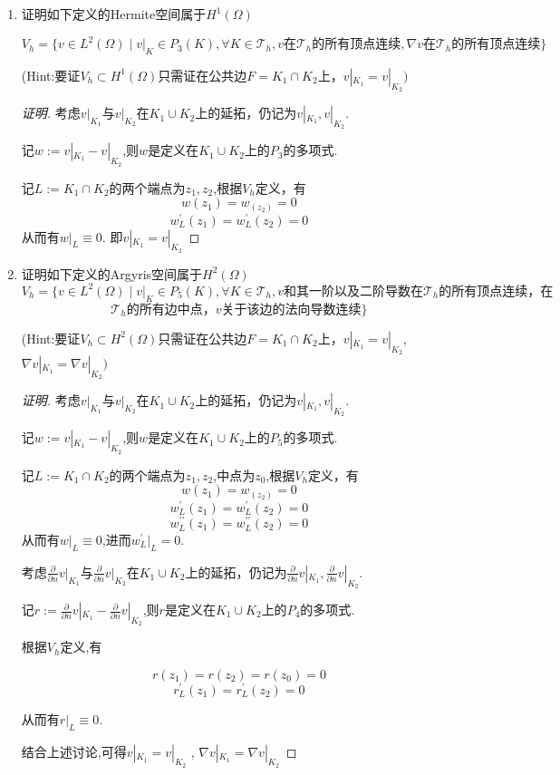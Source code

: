 \documentclass[12pt,a4paper]{article}
\begin{document}
\begin{enumerate}
		\item 证明如下定义的Hermite空间属于$H^1(\Omega)$
		
		$$
		V_h=\{v\in L^2(\Omega)\mid v|_K\in P_3(K),\forall K\in \mathcal{T}_h,v\text{在}\mathcal{T}_h\text{的所有顶点连续},\nabla v\text{在}\mathcal{T}_h\text{的所有顶点连续}\}
		$$
		
		(Hint:要证$V_h\subset H^1(\Omega)$只需证在公共边$F=K_1\cap K_2$上，$v|_{K_1}=v|_{K_2})$
		
		\begin{proof}[证明]
			考虑$v|_{K_1}$与$v|_{K_2}$在$K_1\cup K_2$上的延拓，仍记为$v|_{K_1},v|_{K_2}$.
			
			记$w := v|_{K_1}-v|_{K_2}$,则$w$是定义在$K_1\cup K_2$上的$P_3$的多项式.
			
			记$L := K_1\cap K_2$的两个端点为$z_1,z_2$,根据$V_h$定义，有
			$$
			w(z_1)=w_(z_2)=0
			$$
			$$
			w_{L}^{\prime}(z_1)=w_{L}^{\prime}(z_2)=0
			$$
			从而有$w|_{L}\equiv0$. 即$v|_{K_1}=v|_{K_2}$
		\end{proof}
		
		\item 证明如下定义的Argyris空间属于$H^2(\Omega)$ 
		$$V_h=\{v\in L^2(\Omega)\mid v|_K\in P_5(K),\forall K\in \mathcal{T}_h,v\text{和其一阶以及二阶导数在}\mathcal{T}_h
		\text{的所有顶点连续，在}$$
		$$\mathcal{T}_h\text{的所有边中点，}v\text{关于该边的法向导数连续}\}$$
		
		(Hint:要证$V_h\subset H^2(\Omega)$只需证在公共边$F=K_1\cap K_2$上，$v|_{K_1}=v|_{K_2}$, $\nabla v|_{K_1}=\nabla v|_{K_2})$
		
		\begin{proof}[证明]
			考虑$v|_{K_1}$与$v|_{K_2}$在$K_1\cup K_2$上的延拓，仍记为$v|_{K_1},v|_{K_2}$.
			
			记$w := v|_{K_1}-v|_{K_2}$,则$w$是定义在$K_1\cup K_2$上的$P_5$的多项式.
			
			记$L := K_1\cap K_2$的两个端点为$z_1,z_2$,中点为$z_0$,根据$V_h$定义，有
			$$
			w(z_1)=w_(z_2)=0
			$$
			$$
			w_{L}^{\prime}(z_1)=w_{L}^{\prime}(z_2)=0
			$$
			$$
			w_{L}^{\prime\prime}(z_1)=w_{L}^{\prime\prime}(z_2)=0
			$$
			从而有$w|_{L}\equiv0$,进而$w_L^\prime|_L=0$.
			
			考虑$\frac{\partial}{\partial n} v|_{K_1}$与$\frac{\partial}{\partial n} v|_{K_2}$在$K_1\cup K_2$上的延拓，仍记为$\frac{\partial}{\partial n} v|_{K_1},\frac{\partial}{\partial n} v|_{K_2}$.
			
			记$r:=\frac{\partial}{\partial n} v|_{K_1}-\frac{\partial}{\partial n} v|_{K_2}$,则$r$是定义在$K_1\cup K_2$上的$P_4$的多项式.
			
			根据$V_h$定义,有
			
			$$r(z_1)=r(z_2)=r(z_0)=0$$
			$$r_L^\prime(z_1)=r_L^\prime(z_2)=0$$
			
			从而有$r|_{L}\equiv0$.
			
			结合上述讨论,可得$v|_{K_1}=v|_{K_2}$ , $\nabla v|_{K_1}=\nabla v|_{K_2}$
		\end{proof}
	\end{enumerate}
	
	
\end{document}

